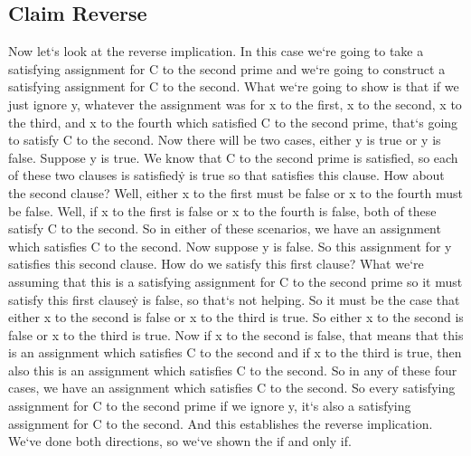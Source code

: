 \subsection{Claim  Reverse}
Now let`s look at the reverse implication.
In this case we`re going to take a satisfying assignment for C to the second prime and we`re going to construct a satisfying assignment for C to the second.
What we`re going to show is that if we just ignore y, whatever the assignment was for x to the first, x to the second, x to the third, and x to the fourth which satisfied C to the second prime, that`s going to satisfy C to the second.
Now there will be two cases, either y is true or y is false.
Suppose y is true.
We know that C to the second prime is satisfied, so each of these two clauses is satisfied\. y is true so that satisfies this clause.
How about the second clause? Well, either x to the first must be false or x to the fourth must be false.
Well, if x to the first is false or x to the fourth is false, both of these satisfy C to the second.
So in either of these scenarios, we have an assignment which satisfies C to the second.
Now suppose y is false.
So this assignment for y satisfies this second clause.
How do we satisfy this first clause? What we`re assuming that this is a satisfying assignment for C to the second prime so it must satisfy this first clause\. y is false, so that`s not helping.
So it must be the case that either x to the second is false or x to the third is true.
So either x to the second is false or x to the third is true.
Now if x to the second is false, that means that this is an assignment which satisfies C to the second and if x to the third is true, then also this is an assignment which satisfies C to the second.
So in any of these four cases, we have an assignment which satisfies C to the second.
So every satisfying assignment for C to the second prime if we ignore y, it`s also a satisfying assignment for C to the second.
And this establishes the reverse implication.
We`ve done both directions, so we`ve shown the if and only if.

